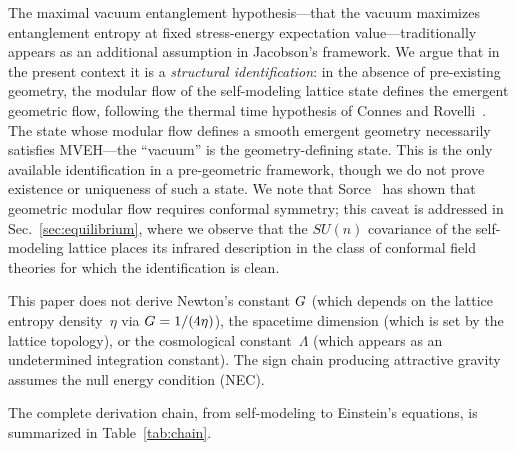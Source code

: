 The maximal vacuum entanglement hypothesis---that the vacuum maximizes
entanglement entropy at fixed stress-energy expectation
value---traditionally appears as an additional assumption in Jacobson's
framework. We argue that in the present context it is a \emph{structural
identification}: in the absence of pre-existing geometry, the modular
flow of the self-modeling lattice state defines the emergent geometric
flow, following the thermal time hypothesis of Connes and
Rovelli~\cite{ConnesRovelli1994}. The state whose modular flow defines a
smooth emergent geometry necessarily satisfies MVEH---the ``vacuum'' is
the geometry-defining state.  This is the only available identification
in a pre-geometric framework, though we do not prove existence or
uniqueness of such a state. We note that Sorce~\cite{Sorce2024} has shown
that geometric modular flow requires conformal symmetry; this caveat is
addressed in Sec.~\ref{sec:equilibrium}, where we observe that the
$SU(n)$ covariance of the self-modeling lattice places its infrared
description in the class of conformal field theories for which the
identification is clean.

This paper does not derive Newton's constant $G$ (which depends on
the lattice entropy density~$\eta$ via $G = 1/(4\eta)$), the
spacetime dimension (which is set by the lattice topology), or the
cosmological constant~$\Lambda$ (which appears as an undetermined
integration constant).  The sign chain producing attractive gravity
assumes the null energy condition (NEC).

The complete derivation chain, from self-modeling to Einstein's equations,
is summarized in Table~\ref{tab:chain}.

